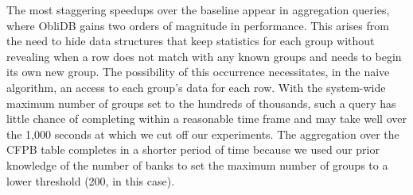 \documentclass[letterpaper,twocolumn,10pt]{article}
\def\name/{ObliDB}
\begin{document}
The most staggering speedups over the baseline appear in aggregation queries, where \name/ gains two orders of magnitude in performance. This arises from the need to hide data structures that keep statistics for each group without revealing when a row does not match with any known groups and needs to begin its own new group. The possibility of this occurrence necessitates, in the naive algorithm, an access to each group's data for each row. With the system-wide maximum number of groups set to the hundreds of thousands, such a query has little chance of completing within a reasonable time frame and may take well over the 1,000 seconds at which we cut off our experiments. The aggregation over the CFPB table completes in a shorter period of time because we used our prior knowledge of the number of banks to set the maximum number of groups to a lower threshold (200, in this case).
\end{document}
